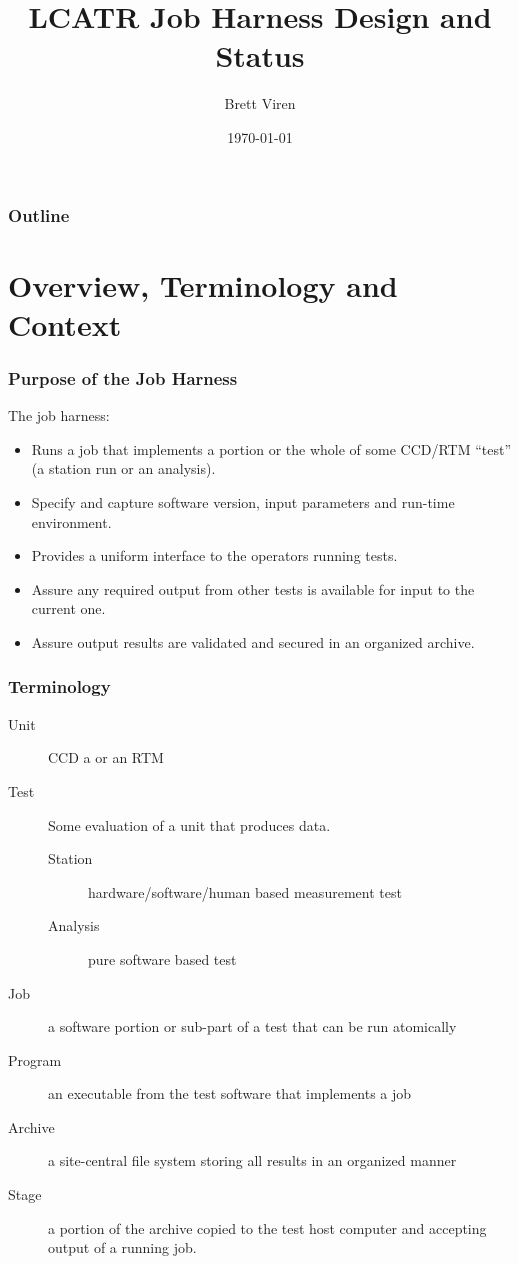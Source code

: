 \documentclass[xcolor=dvipsnames]{beamer}
\title[Job Harness]{LCATR Job Harness Design and Status}
\author{Brett Viren}
\institute[BNL]
{
  Physics Department

  \texttt{[image: bnl-logo]}
}
\date{\today}
\begin{document}
\maketitle

\begin{frame}
\frametitle{Outline}
\tableofcontents
\end{frame}

\section{Overview, Terminology and Context}

\begin{frame}
  \frametitle{Purpose of the Job Harness}

  The job harness:
  \begin{itemize}
  \item Runs a job that implements a portion or the whole of some
    CCD/RTM ``test'' (a station run or an analysis).
  \item Specify and capture software version, input parameters and
    run-time environment.
  \item Provides a uniform interface to the operators running tests.
  \item Assure any required output from other tests is available for
    input to the current one.
  \item Assure output results are validated and secured in an
    organized archive.
  \end{itemize}
\end{frame}

\begin{frame}
  \frametitle{Terminology}
  \begin{description}
  \item[Unit] CCD a or an RTM
  \item[Test] Some evaluation of a unit that produces data.
    \begin{description}
      \item[Station] hardware/software/human based measurement test
      \item[Analysis] pure software based test
    \end{description}
  \item[Job] a software portion or sub-part of a test that can be run atomically
  \item[Program] an executable from the test software that implements a job
  \item[Archive] a site-central file system storing all results in an organized manner
  \item[Stage] a portion of the archive copied to the test host
    computer and accepting output of a running job.
  \end{description}
\end{frame}
\end{document}
